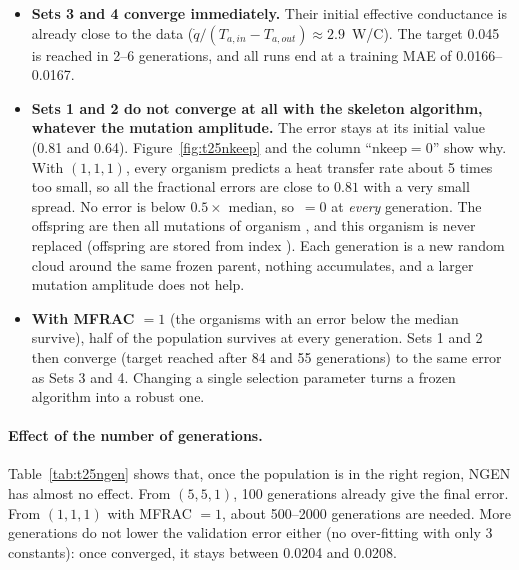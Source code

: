 \begin{itemize}
  \item \textbf{Sets 3 and 4 converge immediately.} Their initial effective conductance is already
        close to the data ($\dot q/(T_{a,in}-T_{a,out})\approx2.9$~W/\textdegree C). The target 0.045 is reached in
        2--6 generations, and all runs end at a training MAE of 0.0166--0.0167.
  \item \textbf{Sets 1 and 2 do not converge at all with the skeleton algorithm, whatever the mutation
        amplitude.} The error stays at its initial value (0.81 and 0.64). Figure~\ref{fig:t25nkeep} and
        the column ``nkeep$=0$'' show why. With $(1,1,1)$, every organism predicts a heat transfer rate
        about 5 times too small, so all the fractional errors are close to $0.81$ with a very small spread.
        No error is below $0.5\times$ median, so $\,=0$ at \emph{every} generation. The
        offspring are then all mutations of organism , and this organism is never replaced
        (offspring are stored from index ). Each generation is a new random cloud around the
        same frozen parent, nothing accumulates, and a larger mutation amplitude does not help.
  \item \textbf{With MFRAC $=1$} (the organisms with an error below the median survive), half of the
        population survives at every generation. Sets 1 and 2 then converge (target reached after 84 and 55
        generations) to the same error as Sets 3 and 4. Changing a single selection parameter turns a
        frozen algorithm into a robust one.
\end{itemize}

\paragraph{Effect of the number of generations.}
Table~\ref{tab:t25ngen} shows that, once the population is in the right region, NGEN has almost no effect.
From $(5,5,1)$, 100 generations already give the final error. From $(1,1,1)$ with MFRAC $=1$, about
500--2000 generations are needed. More generations do not lower the validation error either (no
over-fitting with only 3 constants): once converged, it stays between 0.0204 and 0.0208.

\begin{table}[H]
\centering\small
\caption{Task 2.5: effect of NGEN (range over 3 seeds; MUT $=\pm9\,\%$).}
\label{tab:t25ngen}
\end{table}

